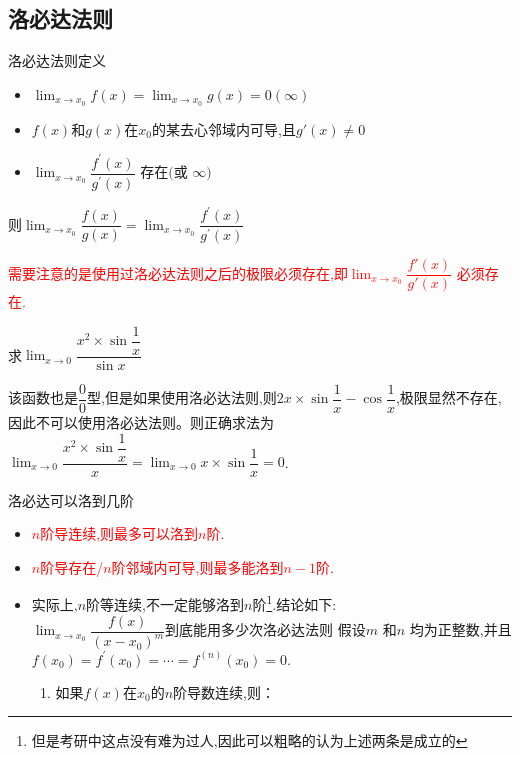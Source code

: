 \documentclass[8pt a4paper, oneside, UTF8]{ctexbook}
\begin{document}
\begin{sloppypar}
    \subsection{洛必达法则}
    \begin{defn}{洛必达法则定义}{}
        \begin{itemize}
            \item $\lim_{x\to x_0}f(x)=\lim_{x\to x_0}g(x)=0(\infty)$
            \item $f(x)$和$g(x)$在$x_0$的某去心邻域内可导,且$g'(x) \neq 0$
            \item $\lim_{x\to x_0}\dfrac{f^{\prime}(x)}{g^{\prime}(x)}\text{ 存在(或 }\infty)$
        \end{itemize}
        则$\lim_{x\to x_{0}}\dfrac{f(x)}{g(x)}=\lim_{x\to x_{0}}\dfrac{f^{'}(x)}{g^{'}(x)}$
    \end{defn}
    \textcolor{red}{需要注意的是使用过洛必达法则之后的极限必须存在,即$\lim _{x \to x_0}\dfrac{f'(x)}{g'(x)}$ 必须存在.}
    \begin{problem}
    求$\lim _{x \to 0}\dfrac{x^2 \times \sin \dfrac{1}{x}}{\sin x}$
    \end{problem}
    \begin{solution}
        该函数也是$\dfrac{0}{0}$型,但是如果使用洛必达法则,则$2x \times \sin \dfrac{1}{x}-\cos \dfrac{1}{x}$,极限显然不存在,因此不可以使用洛必达法则。则正确求法为$\lim _{x\to 0}\dfrac{x^2\times \sin \dfrac{1}{x}}{x}=\lim_{x\to 0}x\times\sin\dfrac{1}{x}=0$.
    \end{solution}
    \begin{criterion}{洛必达可以洛到几阶}{}
        \begin{itemize}
            \item \textcolor{red}{$n$阶导连续,则最多可以洛到$n$阶}.
            \item \textcolor{red}{$n$阶导存在/$n$阶邻域内可导,则最多能洛到$n-1$阶}.
            \item 实际上,$n$阶等连续,不一定能够洛到$n$阶\footnote{但是考研中这点没有难为过人,因此可以粗略的认为上述两条是成立的}.结论如下:\\
            $\lim_{x\to x_0}\dfrac{f(x)}{\left(x-x_0\right)^m}$到底能用多少次洛必达法则
            假设$m$ 和$n$ 均为正整数,并且 $f(x_0)=f^{\prime}(x_0)=\cdots=f^{(n)}(x_0)=0.$ 
            \begin{enumerate}
                \item 如果$f(x)$在$x_0$的$n$阶导数连续,则：
                    \begin{enumerate}

\end{enumerate}
\end{enumerate}
\end{itemize}
\end{criterion}
\end{sloppypar}
\end{document}
